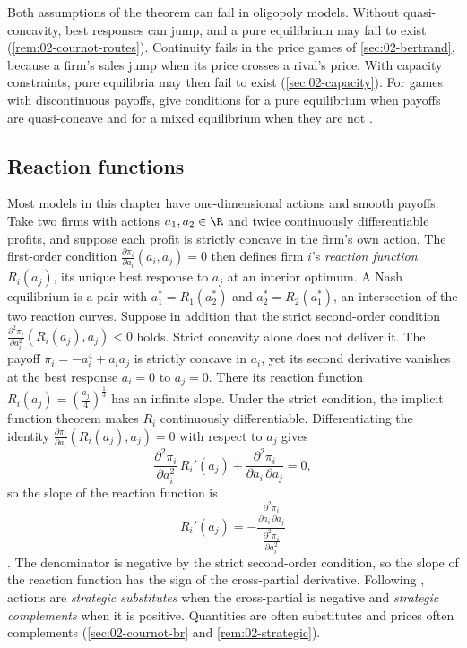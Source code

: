 Both assumptions of the theorem can fail in oligopoly models. Without quasi-concavity, best responses can jump, and a
pure equilibrium may fail to exist (\cref{rem:02-cournot-routes}). Continuity fails in the price games of
\cref{sec:02-bertrand}, because a firm's sales jump when its price crosses a rival's price. With capacity
constraints, pure equilibria may then fail to exist (\cref{sec:02-capacity}). For games with discontinuous payoffs,
\citet{DasguptaMaskin1986} give conditions for a pure equilibrium when payoffs are quasi-concave and for a mixed
equilibrium when they are not \citep[sec.~11.6.1]{Tirole1988}.

\subsection{Reaction functions}\label{sec:02-reaction}

Most models in this chapter have one-dimensional actions and smooth payoffs. Take two firms with actions
$a_1, a_2 \in \R$ and twice continuously differentiable profits, and suppose each profit is strictly concave in the
firm's own action. The first-order condition $\frac{\partial \pi_i}{\partial a_i}(a_i, a_j) = 0$ then defines firm
$i$'s \emph{reaction function} $R_i(a_j)$, its unique best response to $a_j$ at an interior optimum. A Nash
equilibrium is a pair with $a_1^* = R_1(a_2^*)$ and $a_2^* = R_2(a_1^*)$, an intersection of the two reaction curves.
Suppose in addition that the strict second-order condition $\frac{\partial^2 \pi_i}{\partial a_i^2}(R_i(a_j), a_j) <
0$ holds. Strict concavity alone does not deliver it. The payoff $\pi_i = -a_i^4 + a_i a_j$ is strictly concave in
$a_i$, yet its second derivative vanishes at the best response $a_i = 0$ to $a_j = 0$. There its reaction function
$R_i(a_j) = \left(\frac{a_j}{4}\right)^{\frac{1}{3}}$ has an infinite slope. Under the strict condition, the implicit
function theorem makes $R_i$ continuously differentiable. Differentiating the identity
$\frac{\partial \pi_i}{\partial a_i}(R_i(a_j), a_j) = 0$ with respect to $a_j$ gives
\[
  \frac{\partial^2 \pi_i}{\partial a_i^2}\,R_i'(a_j) + \frac{\partial^2 \pi_i}{\partial a_i\,\partial a_j} = 0 ,
\]
so the slope of the reaction function is
\begin{equation}\label{eq:02-reaction-slope}
  R_i'(a_j) = -\frac{\frac{\partial^2 \pi_i}{\partial a_i\,\partial a_j}}{\frac{\partial^2 \pi_i}{\partial a_i^2}}
\end{equation}
\citep[introduction to Part~II, eq.~(5)]{Tirole1988}. The denominator is negative by the strict second-order
condition, so the slope of the reaction
function has the sign of the cross-partial derivative. Following \citet{BulowGeanakoplosKlemperer1985}, actions are \emph{strategic
substitutes} when the cross-partial is negative and \emph{strategic complements} when it is positive. Quantities are
often substitutes and prices often complements (\cref{sec:02-cournot-br} and \cref{rem:02-strategic}).

